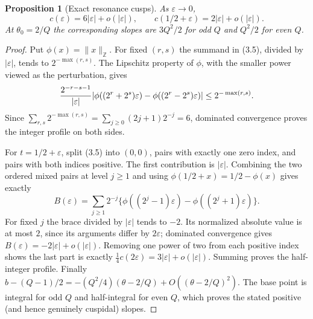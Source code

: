 \documentclass[11pt]{article}
\numberwithin{equation}{section}
\newtheorem{proposition}[theorem]{Proposition}
\newcommand{\1}{\mathbf 1}\newcommand{\F}{\mathcal F}\newcommand{\D}{\mathcal D}
\begin{document}
\begin{proposition}[Exact resonance cusps]\label{prop:exact-cusps}
As $\varepsilon\to0$,
\[
 c(\varepsilon)=6|\varepsilon|+o(|\varepsilon|),\qquad
 c(1/2+\varepsilon)=2|\varepsilon|+o(|\varepsilon|).           \tag{3.6}
\]
At $\theta_0=2/Q$ the corresponding slopes are $3Q^2/2$ for odd $Q$ and
$Q^2/2$ for even $Q$.
\end{proposition}
\begin{proof}
Put $\phi(x)=\|x\|_{\mathbb Z}$.  For fixed $(r,s)$ the summand in (3.5),
divided by $|\varepsilon|$, tends to $2^{-\max(r,s)}$.  The Lipschitz
property of $\phi$, with the smaller power viewed as the perturbation, gives
\[
 {2^{-r-s-1}\over|\varepsilon|}
 |\phi((2^r+2^s)\varepsilon)-\phi((2^r-2^s)\varepsilon)|
 \le2^{-\max(r,s)}.
\]
Since $\sum_{r,s}2^{-\max(r,s)}=\sum_{j\ge0}(2j+1)2^{-j}=6$, dominated
convergence proves the integer profile on both sides.

For $t=1/2+\varepsilon$, split (3.5) into $(0,0)$, pairs with exactly one
zero index, and pairs with both indices positive.  The first contribution is
$|\varepsilon|$.  Combining the two ordered mixed pairs at level $j\ge1$
and using $\phi(1/2+x)=1/2-\phi(x)$ gives exactly
\[
 B(\varepsilon)=\sum_{j\ge1}2^{-j}
 \{\phi((2^j-1)\varepsilon)-\phi((2^j+1)\varepsilon)\}.
\]
For fixed $j$ the brace divided by $|\varepsilon|$ tends to $-2$.
Its normalized absolute value is at most $2$, since its arguments differ by
$2\varepsilon$; dominated convergence gives
$B(\varepsilon)=-2|\varepsilon|+o(|\varepsilon|)$.  Removing one power of
two from each positive index shows the last part is exactly
$\frac14c(2\varepsilon)=3|\varepsilon|+o(|\varepsilon|)$.  Summing proves
the half-integer profile.  Finally
$b-(Q-1)/2=-(Q^2/4)(\theta-2/Q)+O((\theta-2/Q)^2)$.
The base point is integral for odd $Q$ and half-integral for even $Q$,
which proves the stated positive (and hence genuinely cuspidal) slopes.
\end{proof}
\end{document}
